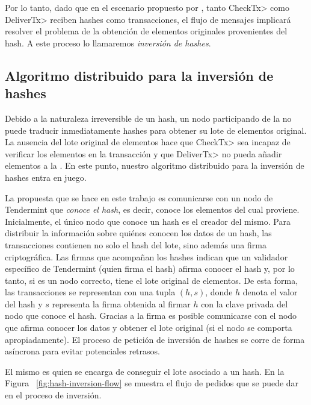 Por lo tanto, dado que en el escenario propuesto por \hashchain, tanto \<CheckTx> como \<DeliverTx> reciben hashes como transacciones,
el flujo de mensajes implicará resolver el problema de la obtención de elementos originales provenientes del hash.
A este proceso lo llamaremos \textit{inversión de hashes}.


\subsection{Algoritmo distribuido para la inversión de hashes}\label{subsec:hash-inversion}

%
%
Debido a la naturaleza irreversible de un hash, un nodo participando de la \setchain no puede traducir
inmediatamente hashes para obtener su lote de elementos original.
%
La ausencia del lote original de elementos hace que \<CheckTx> sea incapaz de verificar los elementos
en la transacción y que \<DeliverTx> no pueda añadir elementos a la \setchain.
%
En este punto, nuestro algoritmo distribuido para la inversión de hashes entra en juego.
%

La propuesta que se hace en este trabajo es comunicarse con un nodo de Tendermint que \textit{conoce el hash}, es decir,
conoce los elementos del cual proviene.
%
Inicialmente, el único nodo que conoce un hash es el creador del mismo.
%
Para distribuir la información sobre quiénes conocen los datos de un hash, las transacciones contienen
no solo el hash del lote, sino además una firma criptográfica.
%
Las firmas que acompañan los hashes indican que un validador específico de Tendermint
(quien firma el hash) afirma conocer el hash y, por lo tanto, si es un nodo correcto,
tiene el lote original de elementos.
%
De esta forma, las transacciones se representan con una tupla $(h, s)$, donde $h$ denota
el valor del hash y $s$ representa la firma obtenida al firmar $h$ con la clave privada
del nodo que conoce el hash.
%
Gracias a la firma es posible comunicarse con el nodo que afirma conocer los datos y obtener
el lote original (si el nodo se comporta apropiadamente).
%
El proceso de petición de inversión de hashes se corre de forma asíncrona para evitar potenciales
retrasos.

El \hcollector mismo es quien se encarga de conseguir el lote asociado a un hash.
%
En la Figura ~\ref{fig:hash-inversion-flow} se muestra el flujo de pedidos que se puede dar
en el proceso de inversión.

